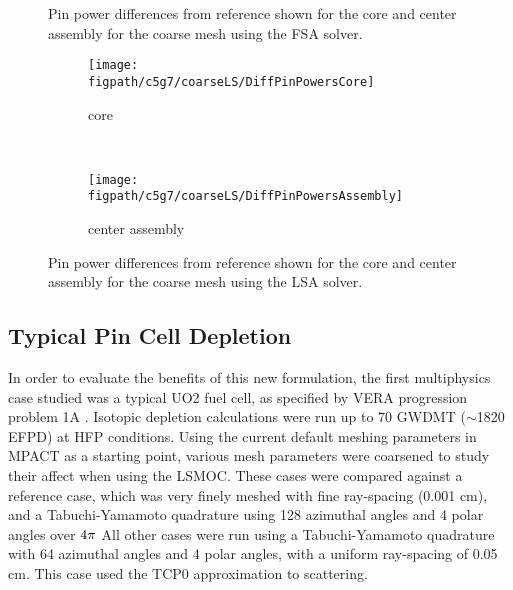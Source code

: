 {{{\begin{figure}[htbp]
\begin{subfigure}[t]{0.49\textwidth}
        \end{subfigure}
        \caption{Pin power differences from reference shown for the core and center assembly for the coarse mesh using the FSA solver.\label{figs:LSMOC:C5G7:CoarseFS:PinPowers}}
      \end{figure}
      \begin{figure}[htbp]
        \centering
        \begin{subfigure}[t]{0.49\textwidth}
          \centering
          \texttt{[image: \\figpath/c5g7/coarseLS/DiffPinPowersCore]}
          \caption{core\label{fig:LSMOC:C5G7:CoarseLS:PinPowers:Core}}
        \end{subfigure}%
        ~
        \begin{subfigure}[t]{0.49\textwidth}
          \centering
            \texttt{[image: \\figpath/c5g7/coarseLS/DiffPinPowersAssembly]}
            \caption{center assembly\label{fig:LSMOC:C5G7:CoarseLS:PinPowers:Assembly}}
        \end{subfigure}
        \caption{Pin power differences from reference shown for the core and center assembly for the coarse mesh using the LSA solver.\label{figs:LSMOC:C5G7:CoarseLS:PinPowers}}
      \end{figure}
    }

    \subsection{Typical Pin Cell Depletion}{\label{ssec:LSMOC:Typical Pin Cell Depletion}
      In order to evaluate the benefits of this new formulation, the first multiphysics case studied was a typical \ac{UO2} fuel cell, as specified by \ac{VERA} progression problem 1A \cite{VERAProblems}.
      Isotopic depletion calculations were run up to 70 \ac{GWDMT} ($\sim$1820 \ac{EFPD}) at \ac{HFP} conditions.
      Using the current default meshing parameters in MPACT as a starting point, various mesh parameters were coarsened to study their affect when using the \ac{LSMOC}.
      These cases were compared against a reference case, which was very finely meshed with fine ray-spacing (0.001 cm), and a Tabuchi-Yamamoto \cite{Yamamoto2005} quadrature using 128 azimuthal angles and 4 polar angles over $4\pi$
      All other cases were run using a Tabuchi-Yamamoto quadrature with 64 azimuthal angles and 4 polar angles, with a uniform ray-spacing of 0.05 cm.
      This case used the \ac{TCP0} approximation to scattering.

}}}
